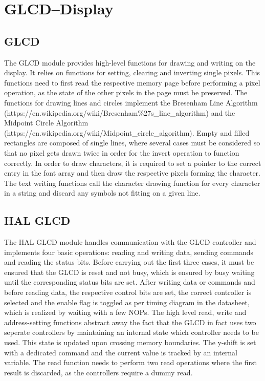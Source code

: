 \documentclass[12pt,a4paper,titlepage,oneside]{article}
\begin{document}
\section{GLCD--Display}

\subsection{GLCD}

The GLCD module provides high-level functions for drawing and writing on the
display. It relies on functions for setting, clearing and inverting single
pixels. This functions need to first read the respective memory page before performing
a pixel operation, as the state of the other pixels in the page must be preserved.
The functions for drawing lines and circles implement the Bresenham Line Algorithm (https://en.wikipedia.org/wiki/Bresenham\%27s\_line\_algorithm)
and the Midpoint Circle Algorithm 
(https://en.wikipedia.org/wiki/Midpoint\_circle\_algorithm). Empty and filled
rectangles are composed of single lines, where several cases must be considered
so that no pixel gets drawn twice in order for the invert operation to
function correctly. In order to draw characters, it is required to set a pointer
to the correct entry in the font array and then draw the respective pixels
forming the character. The text writing functions call the character
drawing function for every character in a string and discard any symbols not
fitting on a given line.

\subsection{HAL GLCD}

The HAL GLCD module handles communication with the GLCD controller and implements
four basic operations: reading and writing data, sending commands and reading
the status bits. Before carrying out the first three cases, it must be ensured
that the GLCD is reset and not busy, which is ensured by busy waiting until
the corresponding status bits are set. After writing data or commands and 
before reading data, the respective control bits are set, the correct controller is selected and the enable flag is
toggled as per timing diagram in the datasheet, which is realized by waiting
with a few NOPs. The high level read, write and address-setting functions
abstract away the fact that the GLCD in fact uses two seperate controllers
by maintaining an internal state which controller needs to be used. This
state is updated upon crossing memory boundaries. The y-shift is set with
a dedicated command and the current value is tracked by an internal variable.
The read function needs to perform two read operations where the first result
is discarded, as the controllers require a dummy read.
\end{document}
